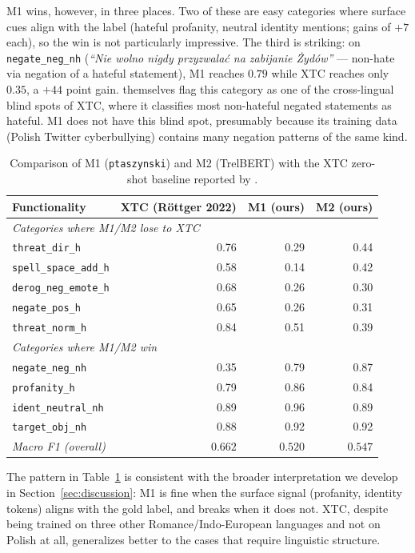 \documentclass[11pt,a4paper]{article}
\begin{document}
M1 wins, however, in three places. Two of these are easy categories where surface cues align with the label (hateful profanity, neutral identity mentions; gains of $+7$ each), so the win is not particularly impressive. The third is striking: on \texttt{negate\_neg\_nh} (\textit{``Nie wolno nigdy przyzwala\'c na zabijanie \.Zyd\'ow''} --- non-hate via negation of a hateful statement), M1 reaches $0.79$ while XTC reaches only $0.35$, a $+44$ point gain. \citet{Rottger2022} themselves flag this category as one of the cross-lingual blind spots of XTC, where it classifies most non-hateful negated statements as hateful. M1 does not have this blind spot, presumably because its training data (Polish Twitter cyberbullying) contains many negation patterns of the same kind.

\begin{table}[h]
\centering
\small
\begin{tabular}{lrrr}
\toprule
Functionality & XTC (R{ö}ttger 2022) & M1 (ours) & M2 (ours) \\
\midrule
\multicolumn{4}{l}{\textit{Categories where M1/M2 lose to XTC}} \\
\texttt{threat\_dir\_h} & 0.76 & 0.29 & 0.44 \\
\texttt{spell\_space\_add\_h} & 0.58 & 0.14 & 0.42 \\
\texttt{derog\_neg\_emote\_h} & 0.68 & 0.26 & 0.30 \\
\texttt{negate\_pos\_h} & 0.65 & 0.26 & 0.31 \\
\texttt{threat\_norm\_h} & 0.84 & 0.51 & 0.39 \\
\midrule
\multicolumn{4}{l}{\textit{Categories where M1/M2 win}} \\
\texttt{negate\_neg\_nh} & 0.35 & 0.79 & 0.87 \\
\texttt{profanity\_h} & 0.79 & 0.86 & 0.84 \\
\texttt{ident\_neutral\_nh} & 0.89 & 0.96 & 0.89 \\
\texttt{target\_obj\_nh} & 0.88 & 0.92 & 0.92 \\
\midrule
\textit{Macro F1 (overall)} & $0.662$ & $0.520$ & $0.547$ \\
\bottomrule
\end{tabular}
\caption{Comparison of M1 (\texttt{ptaszynski}) and M2 (TrelBERT) with the XTC zero-shot baseline reported by \citet{Rottger2022}.}
\label{tab:q2}
\end{table}

The pattern in Table~\ref{tab:q2} is consistent with the broader interpretation we develop in Section~\ref{sec:discussion}: M1 is fine when the surface signal (profanity, identity tokens) aligns with the gold label, and breaks when it does not. XTC, despite being trained on three other Romance/Indo-European languages and not on Polish at all, generalizes better to the cases that require linguistic structure.
\end{document}
